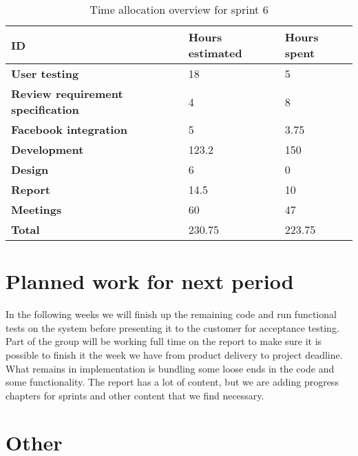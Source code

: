 \documentclass[12pt]{article}
\begin{document}
\begin{table}[H]
\label{tab:timealloc}
    \centering
    \begin{tabular}{|l|l|l|}%
    \hline 
    \textbf{ID} & \textbf{Hours estimated} & \textbf{Hours spent}\\\hline
    \textbf{User testing} &18&5\\\hline
\textbf{Review requirement specification} & 4 &8 \\\hline
\textbf{Facebook integration}&5&3.75\\\hline


\textbf{Development} &123.2& 150\\\hline

\textbf{Design}&6&0\\\hline
\textbf{Report}&14.5 &10 \\\hline
\textbf{Meetings} &60&47\\\hline
\textbf{Total} & 230.75&223.75 \\\hline
    \end{tabular}
    \caption{Time allocation overview for sprint 6}

\end{table}


\section{Planned work for next period}
In the following weeks we will finish up the remaining code and run functional tests on the system before presenting it to the customer for acceptance testing. Part of the group will be working full time on the report to make sure it is possible to finish it the week we have from product delivery to project deadline. What remains in implementation is bundling some loose ends in the code and some functionality. The report has a lot of content, but we are adding progress chapters for sprints and other content that we find necessary. 

\section{Other}
\end{document}
